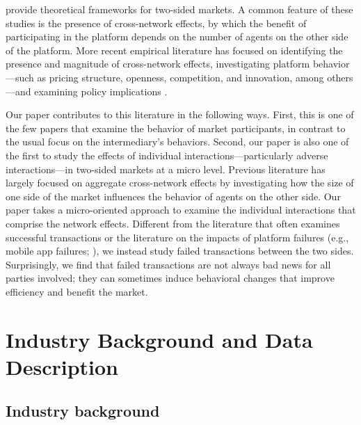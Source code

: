 \documentclass[reviewmode]{AEA}
\begin{document}
\citet{armstrong2006competition,caillaud2001competing, caillaud2003chicken,rochet2003platform, rochet2006two} provide theoretical frameworks for two-sided markets. A common feature of these studies is the presence of cross-network effects, by which the benefit of participating in the platform depends on the number of agents on the other side of the platform. More recent empirical literature has focused on identifying the presence and magnitude of cross-network effects, investigating platform behavior---such as pricing structure, openness, competition, and innovation, among others---and examining policy implications \citep{rysman2009economics, sriram2015platforms}.

Our paper contributes to this literature in the following ways.  First, this is one of the few papers that examine the behavior of market participants, in contrast to the usual focus on the intermediary's behaviors. 
Second, our paper is also one of the first to study the effects of individual interactions---particularly adverse interactions---in two-sided markets at a micro level. Previous literature has largely focused on aggregate cross-network effects by investigating how the size of one side of the market influences the behavior of agents on the other side. Our paper takes a micro-oriented approach to examine the individual interactions that comprise the network effects. Different from the literature that often  examines successful transactions \citep{zhang2017meet,lin2015home,chintagunta2017quantifying,dai2018multistep} or the literature on the impacts of platform failures (e.g., mobile app failures; \citep{narang2018impact}), we instead study failed transactions between the two sides. Surprisingly, we find that failed transactions are not always bad news for all parties involved; they can sometimes induce behavioral changes that improve efficiency and benefit the market.


\section{Industry Background and Data Description}


\subsection{Industry background}
\end{document}
